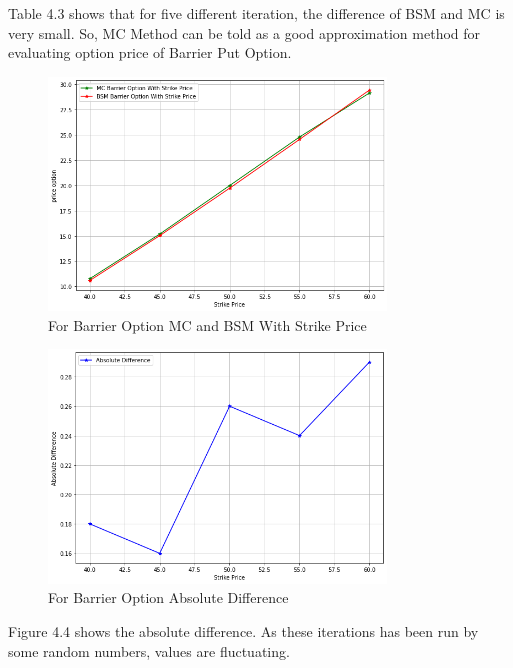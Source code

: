 \noindent Table 4.3 shows that for five different iteration, the difference of BSM and MC is very small. So, MC Method can be told as a good approximation method for evaluating option price of Barrier Put Option.

\begin{figure}[H]
	\begin{center}
		\includegraphics[width=0.8\textwidth]{barrier_mc_bsm}
	\end{center}
	\caption{For Barrier Option MC and BSM With Strike Price}
\end{figure}

\begin{figure}[H]
	\begin{center}
		\includegraphics[width=0.8\textwidth]{For_Barrier_Option_Absolute_Difference}
	\end{center}
	\caption{For Barrier Option Absolute Difference}
\end{figure}


\noindent Figure 4.4 shows the absolute difference. As these iterations has been run by some random numbers, values are fluctuating. 